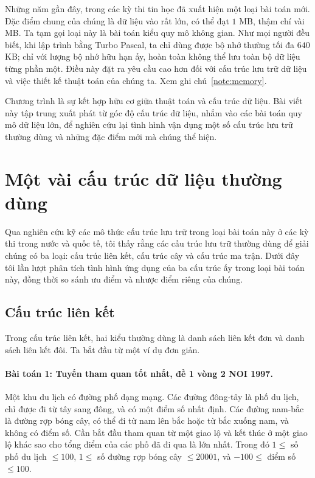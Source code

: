 \documentclass[11pt]{article}
\begin{document}
Những năm gần đây, trong các kỳ thi tin học đã xuất hiện một loại bài toán
mới. Đặc điểm chung của chúng là dữ liệu vào rất lớn, có thể đạt \(1\) MB,
thậm chí vài MB. Ta tạm gọi loại này là bài toán kiểu quy mô không gian. Như
mọi người đều biết, khi lập trình bằng Turbo Pascal, ta chỉ dùng được bộ nhớ
thường tối đa \(640\) KB; chỉ với lượng bộ nhớ hữu hạn ấy, hoàn toàn không
thể lưu toàn bộ dữ liệu từng phần một. Điều này đặt ra yêu cầu cao hơn đối
với cấu trúc lưu trữ dữ liệu và việc thiết kế thuật toán của chúng ta. Xem
ghi chú~\ref{note:memory}.

Chương trình là sự kết hợp hữu cơ giữa thuật toán và cấu trúc dữ liệu. Bài
viết này tập trung xuất phát từ góc độ cấu trúc dữ liệu, nhắm vào các bài
toán quy mô dữ liệu lớn, để nghiên cứu lại tình hình vận dụng một số cấu
trúc lưu trữ thường dùng và những đặc điểm mới mà chúng thể hiện.

\section{Một vài cấu trúc dữ liệu thường dùng}

Qua nghiên cứu kỹ các mô thức cấu trúc lưu trữ trong loại bài toán này ở các
kỳ thi trong nước và quốc tế, tôi thấy rằng các cấu trúc lưu trữ thường dùng
để giải chúng có ba loại: cấu trúc liên kết, cấu trúc cây và cấu trúc ma
trận. Dưới đây tôi lần lượt phân tích tình hình ứng dụng của ba cấu trúc ấy
trong loại bài toán này, đồng thời so sánh ưu điểm và nhược điểm riêng của
chúng.

\subsection{Cấu trúc liên kết}

Trong cấu trúc liên kết, hai kiểu thường dùng là danh sách liên kết đơn và
danh sách liên kết đôi. Ta bắt đầu từ một ví dụ đơn giản.

\paragraph{Bài toán 1: Tuyến tham quan tốt nhất, đề 1 vòng 2 NOI 1997.}

Một khu du lịch có đường phố dạng mạng. Các đường đông-tây là phố du lịch,
chỉ được đi từ tây sang đông, và có một điểm số nhất định. Các đường nam-bắc
là đường rợp bóng cây, có thể đi từ nam lên bắc hoặc từ bắc xuống nam, và
không có điểm số. Cần bắt đầu tham quan từ một giao lộ và kết thúc ở một giao
lộ khác sao cho tổng điểm của các phố đã đi qua là lớn nhất. Trong đó
\(1\le\) số phố du lịch \(\le 100\), \(1\le\) số đường rợp bóng cây
\(\le 20001\), và \(-100\le\) điểm số \(\le 100\).
\end{document}
